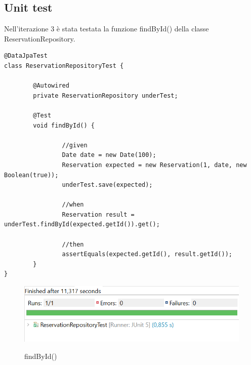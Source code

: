 \subsection{Unit test}
Nell'iterazione 3 è stata testata la funzione findById() della classe ReservationRepository.

\begin{lstlisting}
@DataJpaTest
class ReservationRepositoryTest {

        @Autowired
        private ReservationRepository underTest;

        @Test
        void findById() {

                //given
                Date date = new Date(100);
                Reservation expected = new Reservation(1, date, new Boolean(true));
                underTest.save(expected);

                //when
                Reservation result = underTest.findById(expected.getId()).get();

                //then
                assertEquals(expected.getId(), result.getId());
        }
}
\end{lstlisting}

\begin{figure}[h!]
\begin{center}

   \includegraphics[width=16cm]{Iterazione 3/test/unit test/test.PNG}\\
  \caption{findById()}
\end{center}
\end{figure}
